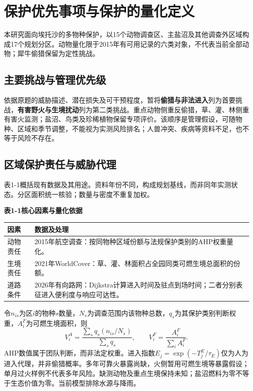 \documentclass[UTF8,fontset=fandol,12pt,a4paper]{ctexart}
\begin{document}
\fontsize{12}{16}\selectfont

\section{保护优先事项与保护的量化定义}

本研究面向埃托沙的多物种保护，以15个动物调查区、主盐沼及其他调查外区域构成17个规划分区。动物量化限于2015年有可用记录的六类对象，不代表当前全部动物；犀牛偷猎保留为定性挑战。

\subsection{主要挑战与管理优先级}

依据原题的威胁描述、潜在损失及可干预程度，暂将\textbf{偷猎与非法进入}列为首要挑战，\textbf{有害野火与生境扰动}列为第二类挑战。重点动物侧重反偷猎，草、灌、林侧重有害火监测；盐沼、鸟类及珍稀植物保留专项评价。该顺序是管理假设，可随物种、区域和季节调整，不能视为实测风险排名；人兽冲突、疾病等资料不足，也不等于风险不存在。

\subsection{区域保护责任与威胁代理}

表1-1概括现有数据及其用途。资料年份不同，构成规划基线，而非同年实测状态。分区面积统一核验；数量与密度不重复加权。

{\centering\textbf{表1-1\quad 核心因素与量化依据}\par}\vspace{3pt}
\noindent\begin{tabularx}{\linewidth}{@{}>{\raggedright\arraybackslash}p{2.35cm}>{\raggedright\arraybackslash}X@{}}
\toprule
因素 & 数据及处理 \\
\midrule
动物责任 & 2015年航空调查：按同物种区域份额与法规保护类别的AHP权重量化。\\
生境责任 & 2021年WorldCover：草、灌、林面积占全园同类可燃生境总面积的份额。\\
道路条件 & 2026年有向路网：Dijkstra计算进入时间及驻点到场时间；二者分别表征进入便利度与响应可达性。\\
\bottomrule
\end{tabularx}
\par\vspace{2pt}

令$n_{is}$为区$i$的物种$s$数量，$N_s$为调查范围内该物种总数，$q_s$为其保护类别判断权重，$A_i^F$为可燃生境面积，则
\begin{equation}
V_i^A=\frac{\sum_s q_s(n_{is}/N_s)}{\sum_s q_s},
\qquad
V_i^F=\frac{A_i^F}{\sum_i A_i^F}.
\label{eq:q1_responsibility}
\end{equation}
AHP数值属于团队判断，而非法定权重。进入指数$E_j=\exp(-T_j^E/\tau_E)$仅为人为进入代理，并非偷猎概率。多年可靠火暴露尚缺，火侧暂用可燃生境等暴露假设；单月过火样例不代表多年风险。缺测动物及重点生境保持未知；盐沼燃料为零不等于生态价值为零。当前模型排除水源与降雨。
\end{document}
